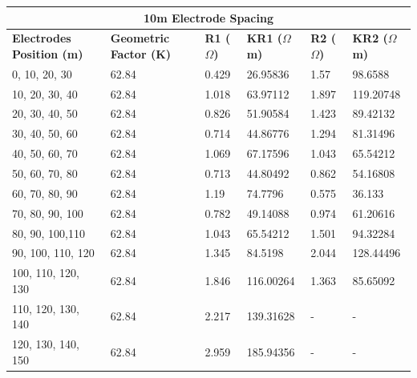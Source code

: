 \documentclass[12pt,a4paper]{report}
\begin{document}
\begin{table}[h!]
    \centering
    \begin{adjustbox}{max width=\textwidth}
    \setlength{\tabcolsep}{15pt}
    \renewcommand{\arraystretch}{1.5}
    \begin{tabular}{|p{3.5cm}|p{2.5cm}|p{2.0cm}|p{2.5cm}|p{2.0cm}|p{2.5cm}|}
    \hline
    \multicolumn{6}{|c|}{\rule{0pt}{2em}\huge\textbf{10m Electrode Spacing}} \\
    \hline
    \textbf{Electrodes Position (m)} & \textbf{Geometric Factor (K)} & \textbf{R1 ($\Omega$)} & \textbf{KR1 ($\Omega$m)} & \textbf{R2 ($\Omega$)} & \textbf{KR2 ($\Omega$m)}  \\ \hline
    0, 10, 20, 30   &	62.84 &	0.429 &	26.95836 &	1.57 &	98.6588 \\ \hline
    10, 20, 30, 40  &	62.84 &	1.018 &	63.97112 &	1.897 &	119.20748 \\ \hline
    20, 30, 40, 50  &	62.84 &	0.826 &	51.90584 &	1.423 &	89.42132 \\ \hline
    30, 40, 50, 60  &	62.84 &	0.714 &	44.86776 &	1.294 &	81.31496 \\ \hline
    40, 50, 60, 70  &	62.84 &	1.069 &	67.17596 &	1.043 &	65.54212 \\ \hline
    50, 60, 70, 80  &	62.84 &	0.713 &	44.80492 &	0.862 &	54.16808 \\ \hline
    60, 70, 80, 90  &	62.84 &	1.19 &	74.7796 &	0.575 &	36.133 \\ \hline
    70, 80, 90, 100 &	62.84 &	0.782 &	49.14088 &	0.974 &	61.20616 \\ \hline
    80, 90, 100,110 &	62.84 &	1.043 &	65.54212 &	1.501 &	94.32284 \\ \hline
    90, 100, 110, 120 &	62.84 &	1.345 &	84.5198 &	2.044 &	128.44496 \\ \hline
    100, 110, 120, 130 &	62.84 &	1.846 &	116.00264 &	1.363 &	85.65092 \\ \hline
    110, 120, 130, 140 &	62.84 &	2.217 &	139.31628 &	- &	- \\ \hline
    120, 130, 140, 150 &	62.84 &	2.959 &	185.94356 &	- &	- \\ \hline
    \end{tabular}
\end{adjustbox}
\end{table}
\end{document}
